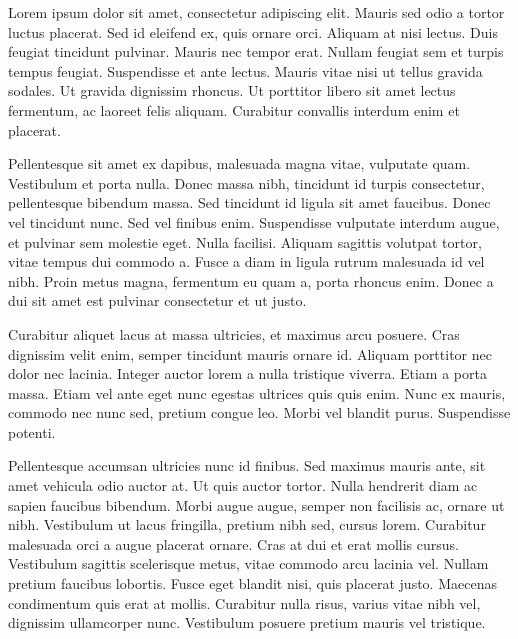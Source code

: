 

Lorem ipsum dolor sit amet, consectetur adipiscing elit. Mauris sed odio a tortor luctus placerat. Sed id eleifend ex, quis ornare orci. Aliquam at nisi lectus. Duis feugiat tincidunt pulvinar. Mauris nec tempor erat. Nullam feugiat sem et turpis tempus feugiat. Suspendisse et ante lectus. Mauris vitae nisi ut tellus gravida sodales. Ut gravida dignissim rhoncus. Ut porttitor libero sit amet lectus fermentum, ac laoreet felis aliquam. Curabitur convallis interdum enim et placerat.

Pellentesque sit amet ex dapibus, malesuada magna vitae, vulputate quam. Vestibulum et porta nulla. Donec massa nibh, tincidunt id turpis consectetur, pellentesque bibendum massa. Sed tincidunt id ligula sit amet faucibus. Donec vel tincidunt nunc. Sed vel finibus enim. Suspendisse vulputate interdum augue, et pulvinar sem molestie eget. Nulla facilisi. Aliquam sagittis volutpat tortor, vitae tempus dui commodo a. Fusce a diam in ligula rutrum malesuada id vel nibh. Proin metus magna, fermentum eu quam a, porta rhoncus enim. Donec a dui sit amet est pulvinar consectetur et ut justo.

Curabitur aliquet lacus at massa ultricies, et maximus arcu posuere. Cras dignissim velit enim, semper tincidunt mauris ornare id. Aliquam porttitor nec dolor nec lacinia. Integer auctor lorem a nulla tristique viverra. Etiam a porta massa. Etiam vel ante eget nunc egestas ultrices quis quis enim. Nunc ex mauris, commodo nec nunc sed, pretium congue leo. Morbi vel blandit purus. Suspendisse potenti.

Pellentesque accumsan ultricies nunc id finibus. Sed maximus mauris ante, sit amet vehicula odio auctor at. Ut quis auctor tortor. Nulla hendrerit diam ac sapien faucibus bibendum. Morbi augue augue, semper non facilisis ac, ornare ut nibh. Vestibulum ut lacus fringilla, pretium nibh sed, cursus lorem. Curabitur malesuada orci a augue placerat ornare. Cras at dui et erat mollis cursus. Vestibulum sagittis scelerisque metus, vitae commodo arcu lacinia vel. Nullam pretium faucibus lobortis. Fusce eget blandit nisi, quis placerat justo. Maecenas condimentum quis erat at mollis. Curabitur nulla risus, varius vitae nibh vel, dignissim ullamcorper nunc. Vestibulum posuere pretium mauris vel tristique.
